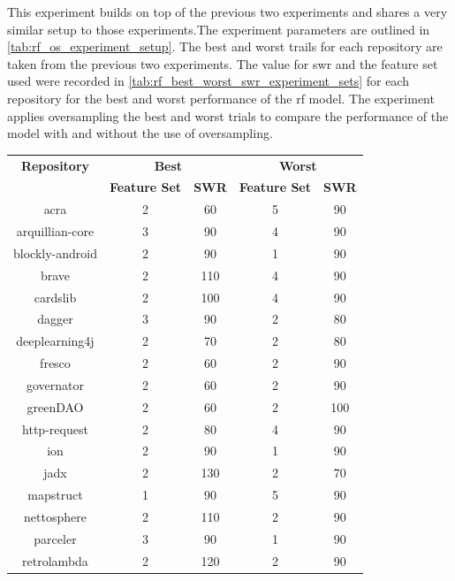 This experiment builds on top of the previous two experiments and shares a very similar setup to those experiments.The experiment parameters are outlined in \autoref{tab:rf_os_experiment_setup}. The best and worst trails for each repository are taken from the previous two experiments. The value for \gls{swr} and the feature set used were recorded in \autoref{tab:rf_best_worst_swr_experiment_sets} for each repository for the best and worst performance of the \gls{rf} model. The experiment applies oversampling the best and worst trials to compare the performance of the model with and without the use of oversampling.

\begin{table}[ht]
\begin{center}

    \begin{tabular}{|c|c|c|c|c|}
        \hline
        \textbf{Repository} & \multicolumn{2}{c|}{\textbf{Best}} & \multicolumn{2}{c|}{\textbf{Worst}} \\ \cline{2-5}
         & \textbf{Feature Set} & \textbf{SWR} & \textbf{Feature Set} & \textbf{SWR} \\ 
        \hline
        acra & 2 & 60 & 5 & 90 \\
        arquillian-core & 3 & 90 & 4 & 90 \\
        blockly-android & 2 & 90 & 1 & 90 \\
        brave & 2 & 110 & 4 & 90 \\
        cardslib & 2 & 100 & 4 & 90 \\
        dagger & 3 & 90 & 2 & 80 \\
        deeplearning4j & 2 & 70 & 2 & 80 \\
        fresco & 2 & 60 & 2 & 90 \\
        governator & 2 & 60 & 2 & 90 \\
        greenDAO & 2 & 60 & 2 & 100 \\
        http-request & 2 & 80 & 4 & 90 \\
        ion & 2 & 90 & 1 & 90 \\
        jadx & 2 & 130 & 2 & 70 \\
        mapstruct & 1 & 90 & 5 & 90 \\
        nettosphere & 2 & 110 & 2 & 90 \\
        parceler & 3 & 90 & 1 & 90 \\
        retrolambda & 2 & 120 & 2 & 90 \\

\end{tabular}
\end{center}
\end{table}
